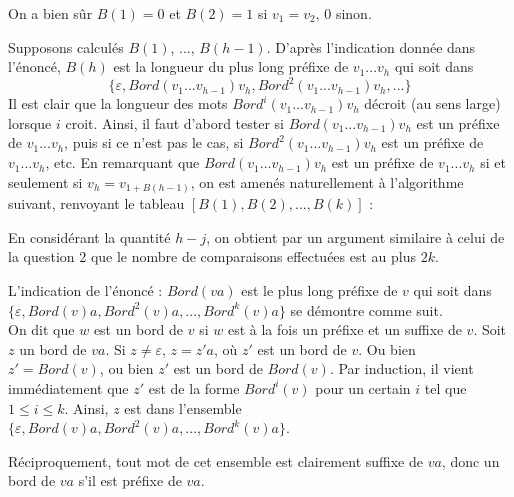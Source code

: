 \Q
On a bien sûr $B(1)=0$ et $B(2)=1$ si $v_1=v_2$, 0 sinon.
\smallskip

Supposons calculés $B(1)$, ..., $B(h-1)$. D'après l'indication donnée dans l'énoncé, $B(h)$ est la longueur du plus long préfixe de $v_1...v_h$ qui soit dans
\[
    \{\varepsilon, Bord(v_1...v_{h-1})v_h,Bord^2(v_1...v_{h-1})v_h, ...\}
\]
Il est clair que la longueur des mots $Bord^i(v_1...v_{h-1})v_h$ décroit (au sens large) lorsque $i$ croit. Ainsi, il faut d'abord tester si $Bord(v_1...v_{h-1})v_h$ est un préfixe de $v_1...v_h$, puis si ce n'est pas le cas, si $Bord^2(v_1...v_{h-1})v_h$ est un préfixe de $v_1...v_h$, etc. En remarquant que $Bord(v_1...v_{h-1})v_h$ est un préfixe de $v_1...v_h$ si et seulement si $v_h=v_{1+B(h-1)}$, on est amenés naturellement à l'algorithme suivant, renvoyant le tableau $[B(1), B(2), ..., B(k)]$ :



En considérant la quantité $h-j$, on obtient par un argument similaire à celui de la question 2 que le nombre de comparaisons effectuées est au plus $2k$.
\bigskip

L'indication de l'énoncé : $Bord(va)$ est le plus long préfixe de $v$ qui soit dans \newline $\{\varepsilon, Bord(v)a,Bord^2(v)a, ..., Bord^k(v)a\}$ se démontre comme suit.\\
On dit que $w$ est un bord de $v$ si $w$ est à la fois un préfixe et un suffixe de $v$. Soit $z$ un bord de $va$. Si $z \neq \varepsilon$, $z = z'a$, où $z'$ est un bord de $v$. Ou bien $z'=Bord(v)$, ou bien $z'$ est un bord de $Bord(v)$. Par induction, il vient immédiatement que $z'$ est de la forme $Bord^i(v)$ pour un certain $i$ tel que $1 \leq i \leq k$. Ainsi, $z$ est dans l'ensemble $\{\varepsilon, Bord(v)a,Bord^2(v)a, ..., Bord^k(v)a\}$.
\smallskip

Réciproquement, tout mot de cet ensemble est clairement suffixe de $va$, donc un bord de $va$ s'il est préfixe de $va$.
\bigskip

\Fin
